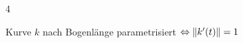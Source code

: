 \documentclass[6pt,a4paper]{scrartcl}
\newcommand{\norm}[2][\relax]{\ifx#1\relax \ensuremath{\left\Vert#2\right\Vert}\else \ensuremath{\left\Vert#2\right\Vert_{#1}}\fi}
\begin{document}
\begin{multicols*}{4}
\begin{sectionbox}
		Kurve $k$ nach Bogenlänge parametrisiert $\Leftrightarrow \norm{k'(t)}=1$
	\end{sectionbox}

\end{multicols*}
\end{document}
